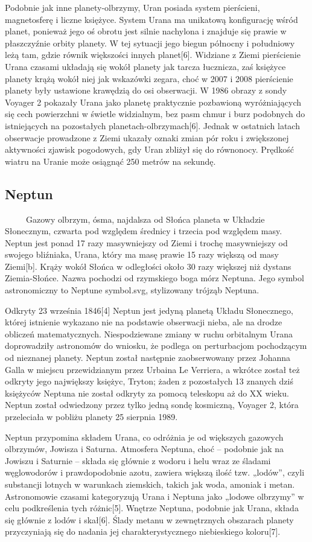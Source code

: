 \documentclass[12pt, letterpaper, titlepage]{article}
\begin{document}
Podobnie jak inne planety-olbrzymy, Uran posiada system pierścieni, magnetosferę i liczne księżyce. System Urana ma unikatową konfigurację wśród planet, ponieważ jego oś obrotu jest silnie nachylona i znajduje się prawie w płaszczyźnie orbity planety. W tej sytuacji jego biegun północny i południowy leżą tam, gdzie równik większości innych planet[6]. Widziane z Ziemi pierścienie Urana czasami układają się wokół planety jak tarcza łucznicza, zaś księżyce planety krążą wokół niej jak wskazówki zegara, choć w 2007 i 2008 pierścienie planety były ustawione krawędzią do osi obserwacji. W 1986 obrazy z sondy Voyager 2 pokazały Urana jako planetę praktycznie pozbawioną wyróżniających się cech powierzchni w świetle widzialnym, bez pasm chmur i burz podobnych do istniejących na pozostałych planetach-olbrzymach[6]. Jednak w ostatnich latach obserwacje prowadzone z Ziemi ukazały oznaki zmian pór roku i zwiększonej aktywności zjawisk pogodowych, gdy Uran zbliżył się do równonocy. Prędkość wiatru na Uranie może osiągnąć 250 metrów na sekundę.
\newpage
\subsection{Neptun}
\ \ \ \ \ Gazowy olbrzym, ósma, najdalsza od Słońca planeta w Układzie Słonecznym, czwarta pod względem średnicy i trzecia pod względem masy. Neptun jest ponad 17 razy masywniejszy od Ziemi i trochę masywniejszy od swojego bliźniaka, Urana, który ma masę prawie 15 razy większą od masy Ziemi[b]. Krąży wokół Słońca w odległości około 30 razy większej niż dystans Ziemia-Słońce. Nazwa pochodzi od rzymskiego boga mórz Neptuna. Jego symbol astronomiczny to Neptune symbol.svg, stylizowany trójząb Neptuna.

Odkryty 23 września 1846[4] Neptun jest jedyną planetą Układu Słonecznego, której istnienie wykazano nie na podstawie obserwacji nieba, ale na drodze obliczeń matematycznych. Niespodziewane zmiany w ruchu orbitalnym Urana doprowadziły astronomów do wniosku, że podlega on perturbacjom pochodzącym od nieznanej planety. Neptun został następnie zaobserwowany przez Johanna Galla w miejscu przewidzianym przez Urbaina Le Verriera, a wkrótce został też odkryty jego największy księżyc, Tryton; żaden z pozostałych 13 znanych dziś księżyców Neptuna nie został odkryty za pomocą teleskopu aż do XX wieku. Neptun został odwiedzony przez tylko jedną sondę kosmiczną, Voyager 2, która przeleciała w pobliżu planety 25 sierpnia 1989.

Neptun przypomina składem Urana, co odróżnia je od większych gazowych olbrzymów, Jowisza i Saturna. Atmosfera Neptuna, choć – podobnie jak na Jowiszu i Saturnie – składa się głównie z wodoru i helu wraz ze śladami węglowodorów i prawdopodobnie azotu, zawiera większą ilość tzw. „lodów”, czyli substancji lotnych w warunkach ziemskich, takich jak woda, amoniak i metan. Astronomowie czasami kategoryzują Urana i Neptuna jako „lodowe olbrzymy” w celu podkreślenia tych różnic[5]. Wnętrze Neptuna, podobnie jak Urana, składa się głównie z lodów i skał[6]. Ślady metanu w zewnętrznych obszarach planety przyczyniają się do nadania jej charakterystycznego niebieskiego koloru[7].
\end{document}
